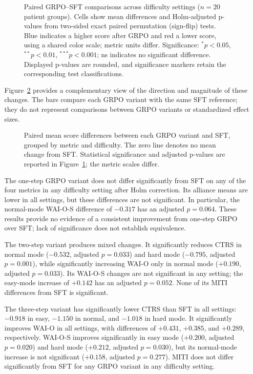 \begin{figure}[H]
\centering

\caption{Paired GRPO--SFT comparisons across difficulty settings ($n=20$ patient groups). Cells show mean differences and Holm-adjusted p-values from two-sided exact paired permutation (sign-flip) tests. Blue indicates a higher score after GRPO and red a lower score, using a shared color scale; metric units differ. Significance: $^{*}p<0.05$, $^{**}p<0.01$, $^{***}p<0.001$; ns indicates no significant difference. Displayed p-values are rounded, and significance markers retain the corresponding test classifications.}
\label{fig:training-stage-heatmap}
\end{figure}

Figure~\ref{fig:training-stage-differences} provides a complementary view of the direction and magnitude of these changes. The bars compare each GRPO variant with the same SFT reference; they do not represent comparisons between GRPO variants or standardized effect sizes.

\begin{figure}[H]
\centering

\caption{Paired mean score differences between each GRPO variant and SFT, grouped by metric and difficulty. The zero line denotes no mean change from SFT. Statistical significance and adjusted p-values are reported in Figure~\ref{fig:training-stage-heatmap}; the metric scales differ.}
\label{fig:training-stage-differences}
\end{figure}

The one-step GRPO variant does not differ significantly from SFT on any of the four metrics in any difficulty setting after Holm correction. Its alliance means are lower in all settings, but these differences are not significant. In particular, the normal-mode WAI-O-S difference of $-0.317$ has an adjusted $p=0.064$. These results provide no evidence of a consistent improvement from one-step GRPO over SFT; lack of significance does not establish equivalence.

The two-step variant produces mixed changes. It significantly reduces CTRS in normal mode ($-0.532$, adjusted $p=0.033$) and hard mode ($-0.795$, adjusted $p=0.001$), while significantly increasing WAI-O only in normal mode ($+0.190$, adjusted $p=0.033$). Its WAI-O-S changes are not significant in any setting; the easy-mode increase of $+0.142$ has an adjusted $p=0.052$. None of its MITI differences from SFT is significant.

The three-step variant has significantly lower CTRS than SFT in all settings: $-0.918$ in easy, $-1.150$ in normal, and $-1.018$ in hard mode. It significantly improves WAI-O in all settings, with differences of $+0.431$, $+0.385$, and $+0.289$, respectively. WAI-O-S improves significantly in easy mode ($+0.200$, adjusted $p=0.020$) and hard mode ($+0.212$, adjusted $p=0.030$), but its normal-mode increase is not significant ($+0.158$, adjusted $p=0.277$). MITI does not differ significantly from SFT for any GRPO variant in any difficulty setting.


